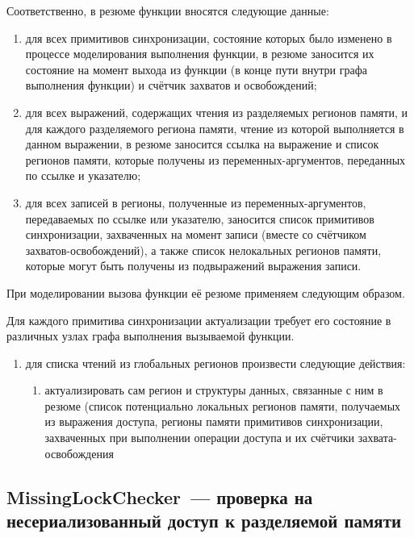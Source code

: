 Соответственно, в резюме функции вносятся следующие данные:

\begin{enumerate}
 \item для всех примитивов синхронизации, состояние которых было изменено в процессе моделирования выполнения функции, в резюме заносится их состояние на момент выхода из функции (в конце пути внутри графа выполнения функции) и счётчик захватов и освобождений;
 \item для всех выражений, содержащих чтения из разделяемых регионов памяти, и для каждого разделяемого региона памяти, чтение из которой выполняется в данном выражении, в резюме заносится ссылка на выражение и список регионов памяти, которые получены из переменных-аргументов, переданных по ссылке и указателю;
 \item для всех записей в регионы, полученные из переменных-аргументов, передаваемых по ссылке или указателю, заносится список примитивов синхронизации, захваченных на момент записи (вместе со счётчиком захватов-освобождений), а также список нелокальных регионов памяти, которые могут быть получены из подвыражений выражения записи.
\end{enumerate}

При моделировании вызова функции её резюме применяем следующим образом.

Для каждого примитива синхронизации актуализации требует его состояние в различных узлах графа выполнения вызываемой функции. 

\begin{enumerate}
 \item для списка чтений из глобальных регионов произвести следующие действия:
 \begin{enumerate}
  \item актуализировать сам регион и структуры данных, связанные с ним в резюме (список потенциально локальных регионов памяти, получаемых из выражения доступа, регионы памяти примитивов синхронизации, захваченных при выполнении операции доступа и их счётчики захвата-освобождения
 \end{enumerate}

\end{enumerate}

\subsection{MissingLockChecker~--- проверка на несериализованный доступ к разделяемой памяти}


